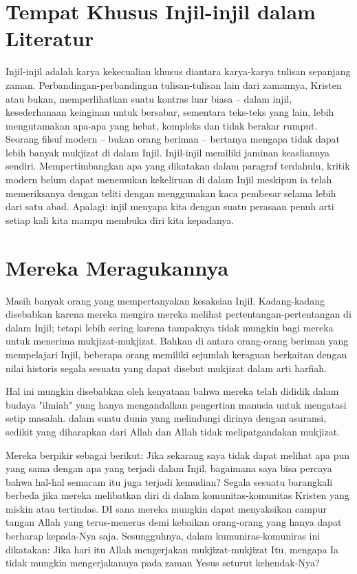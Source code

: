 \section*{Tempat Khusus Injil-injil dalam Literatur}
Injil-injil adalah karya kekecualian khusus diantara karya-karya tulisan sepanjang zaman. Perbandingan-perbandingan tulisan-tulisan lain dari zamannya, Kristen atau bukan, memperlihatkan suatu kontras luar biasa -- dalam injil, kesederhanaan keinginan untuk bersabar, sementara teks-teks yang lain, lebih mengutamakan apa-apa yang hebat, kompleks dan tidak berakar rumput. Seorang filsuf modern -- bukan orang beriman -- bertanya mengapa tidak dapat lebih banyak mukjizat di dalam Injil. Injil-injil memiliki jaminan keasliannya sendiri. Mempertimbangkan apa yang dikatakan dalam paragraf terdahulu, kritik modern belum dapat menemukan kekeliruan di dalam Injil meskipun ia telah memeriksanya dengan teliti dengan menggunakan kaca pembesar selama lebih dari satu abad. Apalagi: injil menyapa kita dengan suatu perasaan penuh arti setiap kali kita mampu membuka diri kita kepadanya.

\section*{Mereka Meragukannya}
Masih banyak orang yang mempertanyakan kesaksian Injil. Kadang-kadang disebabkan karena mereka mengira mereka melihat pertentangan-pertentangan di dalam Injil; tetapi lebih sering karena tampaknya tidak mungkin bagi mereka untuk menerima mukjizat-mukjizat. Bahkan di antara orang-orang beriman yang mempelajari Injil, beberapa orang memiliki sejumlah keraguan berkaitan dengan nilai historis segala sesuatu yang dapat disebut mukjizat dalam arti harfiah.

Hal ini mungkin disebabkan oleh kenyataan bahwa mereka telah dididik dalam budaya "ilmiah" yang hanya mengandalkan pengertian manusia untuk mengatasi setip masalah. dalam suatu dunia yang melindungi dirinya dengan asuransi, sedikit yang diharapkan dari Allah dan Allah tidak melipatgandakan mukjizat.

Mereka berpikir sebagai berikut: Jika sekarang saya tidak dapat melihat apa pun yang sama dengan apa yang terjadi dalam Injil, bagaimana saya bisa percaya bahwa hal-hal semacam itu juga terjadi kemudian? Segala sesuatu barangkali berbeda jika mereka melibatkan diri di dalam komunitas-komunitas Kristen yang miskin atau tertindas. DI sana mereka mungkin dapat menyaksikan campur tangan Allah yang terus-menerus demi kebaikan orang-orang yang hanya dapat berharap kepada-Nya saja. Sesungguhnya, dalam kumuniras-komuniras ini dikatakan: Jika hari itu Allah mengerjakan mukjizat-mukjizat Itu, mengapa Ia tidak mungkin mengerjakannya pada zaman Yesus seturut kehendak-Nya?

